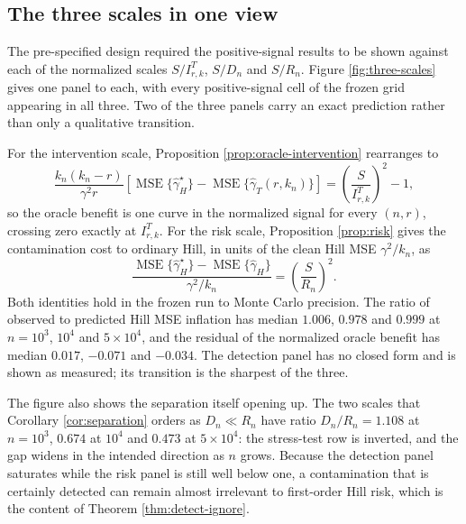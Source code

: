 \documentclass[11pt]{article}
\newcommand{\ghat}{\widehat{\gamma}}
\begin{document}
\FloatBarrier

\subsection{The three scales in one view}

The pre-specified design required the positive-signal results to be shown
against each of the normalized scales $S/I^{T}_{r,k}$, $S/D_n$ and $S/R_n$.
Figure \ref{fig:three-scales} gives one panel to each, with every
positive-signal cell of the frozen grid appearing in all three.
Two of the three panels carry an exact prediction rather than only a
qualitative transition.

For the intervention scale, Proposition \ref{prop:oracle-intervention}
rearranges to
\[
  \frac{k_n(k_n-r)}{\gamma^2r}
  \left[
    \operatorname{MSE}\{\ghat_H^\star\}
    -
    \operatorname{MSE}\{\ghat_T(r,k_n)\}
  \right]
  =
  \left(\frac{S}{I^{T}_{r,k}}\right)^2-1,
\]
so the oracle benefit is one curve in the normalized signal for every $(n,r)$,
crossing zero exactly at $I^{T}_{r,k}$.  For the risk scale, Proposition
\ref{prop:risk} gives the contamination cost to ordinary Hill, in units of the
clean Hill MSE $\gamma^2/k_n$, as
\[
  \frac{
    \operatorname{MSE}\{\ghat_H^\star\}-\operatorname{MSE}\{\ghat_H\}
  }{\gamma^2/k_n}
  =
  \left(\frac{S}{R_n}\right)^2 .
\]
Both identities hold in the frozen run to Monte Carlo precision.  The ratio of
observed to predicted Hill MSE inflation has median $1.006$, $0.978$ and
$0.999$ at $n=10^3$, $10^4$ and $5\times10^4$, and the residual of the
normalized oracle benefit has median $0.017$, $-0.071$ and $-0.034$.  The
detection panel has no closed form and is shown as measured; its transition is
the sharpest of the three.

The figure also shows the separation itself opening up.  The two scales that
Corollary \ref{cor:separation} orders as $D_n\ll R_n$ have ratio
$D_n/R_n=1.108$ at $n=10^3$, $0.674$ at $10^4$ and $0.473$ at $5\times10^4$:
the stress-test row is inverted, and the gap widens in the intended direction
as $n$ grows.  Because the detection panel saturates while the risk panel is
still well below one, a contamination that is certainly detected can remain
almost irrelevant to first-order Hill risk, which is the content of Theorem
\ref{thm:detect-ignore}.
\end{document}

